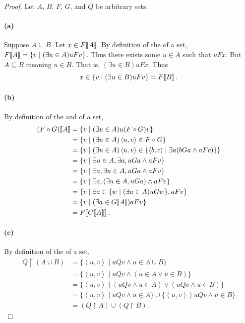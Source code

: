 \documentclass{report}
\begin{document}
\begin{proof}

  Let $A$, $B$, $F$, $G$, and $Q$ be arbitrary sets.

  \paragraph{(a)}%

    Suppose $A \subseteq B$.
    Let $x \in F\!\left\llbracket A\right\rrbracket$.
    By definition of the  of a set,
      $F\!\left\llbracket A\right\rrbracket = \{v \mid (\exists u \in A) uFv\}$.
    Thus there exists some $u \in A$ such that $uFx$.
    But $A \subseteq B$ meaning $u \in B$.
    That is, $(\exists u \in B)uFx$.
    Thus $$x \in \{v \mid (\exists u \in B)uFv\} = F\!\left\llbracket B\right\rrbracket.$$

  \paragraph{(b)}%

    By definition of the  and  of a
      set,
      \begin{align*}
        (F \circ G)\!\left\llbracket A\right\rrbracket
          & = \{v \mid (\exists u \in A) u(F \circ G)v\} \\
          & = \{v \mid (\exists u \in A) \left< u, v \right> \in F \circ G\} \\
          & = \{v \mid (\exists u \in A)
            \left< u, v \right> \in \{\left< b, c \right> \mid
              \exists a(bGa \land aFc)\}\} \\
          & = \{v \mid \exists u \in A, \exists a, uGa \land aFv\} \\
          & = \{v \mid \exists a, \exists u \in A, uGa \land aFv\} \\
          & = \{v \mid \exists a, (\exists u \in A, uGa) \land aFv\} \\
          & = \{v \mid \exists a \in \{w \mid (\exists u \in A)uGw\}, aFv\} \\
          & = \{v \mid (\exists a \in G\!\left\llbracket A\right\rrbracket) aFv\} \\
          & = F\!\left\llbracket G\!\left\llbracket A\right\rrbracket\right\rrbracket.
      \end{align*}

  \paragraph{(c)}%

    By definition of the  of a set,
      \begin{align*}
        Q \restriction (A \cup B)
          & = \{\left< u, v \right> \mid uQv \land u \in A \cup B\} \\
          & = \{\left< u, v \right> \mid uQv \land (u \in A \lor u \in B)\} \\
          & = \{\left< u, v \right> \mid
            (uQv \land u \in A) \lor (uQv \land u \in B)\} \\
          & = \{\left< u, v \right> \mid uQv \land u \in A\} \cup
            \{\left< u, v \right> \mid uQv \land u \in B\} \\
          & = (Q \restriction A) \cup (Q \restriction B).
      \end{align*}


\end{proof}
\end{document}
